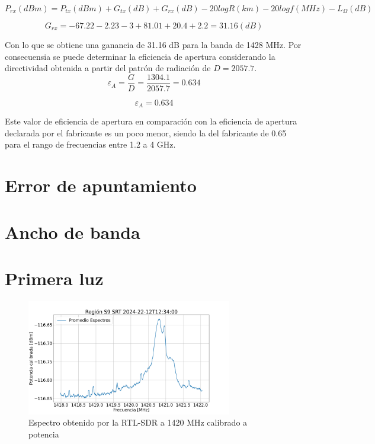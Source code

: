 \begin{equation}
    P_{rx}(dBm) = P_{tx}(dBm) + G_{tx}(dB) + G_{rx}(dB) - 20log{R}(km) - 20log{f}(MHz) - L_{\Omega}(dB)
\end{equation}

\begin{equation}
    G_{rx} = -67.22 -2.23 - 3 + 81.01 + 20.4 + 2.2 = 31.16 (dB)
\end{equation}

Con lo que se obtiene una ganancia de 31.16 dB para la banda de 1428 MHz. Por consecuensia se puede determinar la eficiencia de apertura considerando la directividad obtenida a partir del patrón de radiación de $D=2057.7$.\\

\begin{equation}
    \varepsilon_{A} = \frac{G}{D} = \frac{1304.1}{2057.7} = 0.634
\end{equation}

\begin{equation}
    \varepsilon_{A} = 0.634
\end{equation}

Este valor de eficiencia de apertura en comparación con la eficiencia de apertura declarada por el fabricante es un poco menor, siendo la del fabricante de 0.65 para el rango de frecuencias entre 1.2 a 4 GHz.\\

\section{Error de apuntamiento}

\section{Ancho de banda}

\section{Primera luz}

\begin{figure}
    \centering
    \includegraphics[width=0.8\textwidth]{img/h1}
    \caption{Espectro obtenido por la RTL-SDR a 1420 MHz calibrado a potencia}
    \label{fig:rtl1428}
\end{figure}